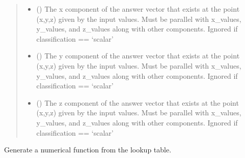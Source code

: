 \documentclass[letterpaper,10pt,english]{sphinxmanual}
\begin{document}
\begin{fulllineitems}
\begin{fulllineitems}
\begin{quote}
\begin{description}
\begin{itemize}
\item {} 
 (\sphinxstyleliteralemphasis{\sphinxupquote{, }}) \textendash{} The x component of the answer vector that exists at the point
(x,y,z) given by the input values. Must be parallel with x\_values,
y\_values, and z\_values along with other components. Ignored if
classification == ‘scalar’

\item {} 
 (\sphinxstyleliteralemphasis{\sphinxupquote{, }}) \textendash{} The y component of the answer vector that exists at the point
(x,y,z) given by the input values. Must be parallel with x\_values,
y\_values, and z\_values along with other components. Ignored if
classification == ‘scalar’

\item {} 
 (\sphinxstyleliteralemphasis{\sphinxupquote{, }}) \textendash{} The z component of the answer vector that exists at the point
(x,y,z) given by the input values. Must be parallel with x\_values,
y\_values, and z\_values along with other components. Ignored if
classification == ‘scalar’

\end{itemize}

\end{description}\end{quote}

\end{fulllineitems}


\begin{fulllineitems}
\label{\detokenize{data_systematization:data_systematization.InterpolationTable.numerical_function}}
Generate a numerical function from the lookup table.


\end{fulllineitems}
\end{fulllineitems}
\end{document}
